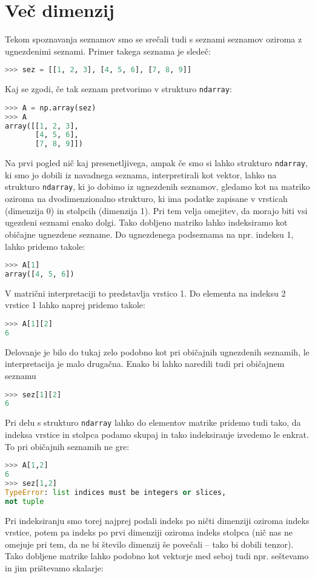 \section{Več dimenzij}

Tekom spoznavanja seznamov smo se srečali tudi s seznami seznamov oziroma z ugnezdenimi seznami. Primer takega seznama je sledeč:
\begin{lstlisting}[language=Python]
>>> sez = [[1, 2, 3], [4, 5, 6], [7, 8, 9]]
\end{lstlisting}
Kaj se zgodi, če tak seznam pretvorimo v strukturo \texttt{ndarray}:
\begin{lstlisting}[language=Python]
>>> A = np.array(sez)
>>> A
array([[1, 2, 3],
       [4, 5, 6],
       [7, 8, 9]])
\end{lstlisting}
Na prvi pogled nič kaj presenetljivega, ampak če smo si lahko strukturo \texttt{ndarray}, ki smo jo dobili iz navadnega seznama, interpretirali kot vektor, lahko na strukturo \texttt{ndarray}, ki jo dobimo iz ugnezdenih seznamov, gledamo kot na matriko oziroma na dvodimenzionalno strukturo, ki ima podatke zapisane v vrsticah (dimenzija 0) in stolpcih (dimenzija 1). Pri tem velja omejitev, da morajo biti vsi ugezdeni seznami enako dolgi. Tako dobljeno matriko lahko indeksiramo kot običajne ugnezdene sezname. Do ugnezdenega podseznama na npr. indeksu 1, lahko pridemo takole:
\begin{lstlisting}[language=Python]
>>> A[1]
array([4, 5, 6])
\end{lstlisting}
V matrični interpretaciji to predstavlja vrstico 1. Do elementa na indeksu 2 vrstice 1 lahko naprej pridemo takole:
\begin{lstlisting}[language=Python]
>>> A[1][2]
6
\end{lstlisting}
Delovanje je bilo do tukaj zelo podobno kot pri običajnih ugnezdenih seznamih, le interpretacija je malo drugačna. Enako bi lahko naredili tudi pri običajnem seznamu
\begin{lstlisting}[language=Python]
>>> sez[1][2]
6
\end{lstlisting}
Pri delu s strukturo \texttt{ndarray} lahko do elementov matrike pridemo tudi tako, da indeksa vrstice in stolpca podamo skupaj in tako indeksiranje izvedemo le enkrat. To pri običajnih seznamih ne gre:
\begin{lstlisting}[language=Python]
>>> A[1,2]
6
>>> sez[1,2]
TypeError: list indices must be integers or slices, 
not tuple
\end{lstlisting}
Pri indeksiranju smo torej najprej podali indeks po ničti dimenziji oziroma indeks vrstice, potem pa indeks po prvi dimenziji oziroma indeks stolpca (nič nas ne omejuje pri tem, da ne bi število dimenzij še povečali -- tako bi dobili tenzor). Tako dobljene matrike lahko podobno kot vektorje med seboj tudi npr. seštevamo in jim prištevamo skalarje:
